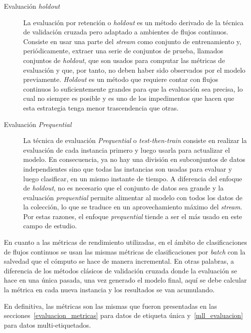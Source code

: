 \begin{description}

	\item[Evaluación \textit{holdout}] La evaluación por retención o
	      \textit{holdout} es un método derivado de la técnica de validación cruzada
	      pero adaptado a ambientes de flujos continuos. Consiste en usar una parte
	      del \textit{stream} como conjunto de entrenamiento y, periódicamente,
	      extraer una serie de conjuntos de prueba, llamados conjuntos de
	      \textit{holdout}, que son usados para computar las métricas de evaluación
	      y que, por tanto, no deben haber sido observados por el modelo
	      previamente.  \textit{Holdout} es un método que requiere contar con flujos
	      continuos lo suficientemente grandes para que la evaluación sea precisa,
	      lo cual no siempre es posible y es uno de los impedimentos que hacen que
	      esta estrategia tenga menor trascendencia que otras.

	\item[Evaluación \textit{Prequential}] La técnica de evaluación
	      \textit{Prequential} o \textit{test-then-train} consiste en realizar la
	      evaluación de cada instancia primero y luego usarla para actualizar el
	      modelo. En consecuencia, ya no hay una división en subconjuntos de datos
	      independientes sino que todas las instancias son usadas para evaluar y
	      luego clasificar, en un mismo instante de tiempo. A diferencia del enfoque
	      de \textit{holdout}, no es necesario que el conjunto de datos sea grande y
	      la evaluación \textit{prequential} permite alimentar al modelo con todos
	      los datos de la colección, lo que se traduce en un aprovechamiento máximo
	      del \textit{stream}. Por estas razones, el enfoque \textit{prequential}
	      tiende a ser el más usado en este campo de estudio.

\end{description}

En cuanto a las métricas de rendimiento utilizadas, en el ámbito de
clasificaciones de flujos continuos se usan las mismas métricas de
clasificaciones por \textit{batch} con la salvedad que el cómputo se hace de
manera incremental. En otras palabras, a diferencia de los métodos clásicos de
validación cruzada donde la evaluación se hace en una única pasada, una vez
generado el modelo final, aquí se debe calcular la métrica en cada nueva
instancia y los resultados se van acumulando.

En definitiva, las métricas son las mismas que fueron presentadas en las
secciones~\ref{evaluacion_metricas} para datos de etiqueta única
y~\ref{mll_evaluacion} para datos multi-etiquetados.


